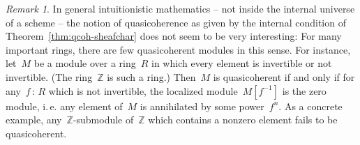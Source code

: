 \documentclass[10pt,reqno,a4paper]{amsbook}
\makeatletter
\theoremstyle{definition}
\theoremstyle{plain}
\theoremstyle{remark}
\newtheorem{rem}[defn]{Remark}
\newcommand{\ZZ}{\mathbb{Z}}
\newcommand{\?}{\,{:}\,}
\renewcommand{\_}{\mathpunct{.}\,}
\newcommand{\ie}{i.\,e.\@\xspace}
\makeatother
\begin{document}
\begin{rem}\label{rem:qcoh-in-constructive-mathematics}
In general intuitionistic mathematics -- not inside the internal universe of a
scheme -- the notion of quasicoherence as given by the internal condition of
Theorem~\ref{thm:qcoh-sheafchar}
does not seem to be very interesting: For many important rings, there are few
quasicoherent modules in this sense. For instance, let~$M$ be a module over a
ring~$R$ in which every element is invertible or not invertible. (The
ring~$\ZZ$ is such a ring.) Then~$M$ is quasicoherent if and only if for any~$f
\? R$ which is not invertible, the localized module~$M[f^{-1}]$ is the zero
module, \ie any element of~$M$ is annihilated by some power~$f^n$. As a
concrete example, any~$\ZZ$-submodule of~$\ZZ$ which contains a nonzero element
fails to be quasicoherent.
\end{rem}
\end{document}
